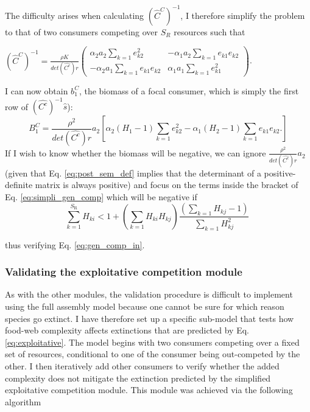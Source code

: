 \documentclass[a4paper]{report}
\begin{document}
The difficulty arises when calculating $(\hat{C}^{C})^{-1}$, I therefore simplify the problem to that of two consumers competing
over $S_{R}$ resources such that
\begin{center}
$(\hat{C}^{C})^{-1}=\frac{\rho K}{det(\hat{C^{c}})r}\begin{pmatrix}\alpha_{2}a_{2}\sum_{k=1}e_{k2}^{2} & -\alpha_{1}a_{2}\sum_{k=1}e_{k1}e_{k2}\\
-\alpha_{2}a_{1}\sum_{k=1}e_{k1}e_{k2} & \alpha_{1}a_{1}\sum_{k=1}e_{k1}^{2}
\end{pmatrix}$.
\end{center}
I can now obtain $b_{1}^{C}$, the biomass of a focal consumer, which
is simply the first row of $(\hat{C^{c}})^{-1}\hat{s}$):
\begin{equation}
B_{1}^{C}=\frac{\rho^{2}}{det(\hat{C^{c}})r}a_{2}[\alpha_{2}(H_{1}-1)\sum_{k=1}e_{k2}^{2}-\alpha_{1}(H_{2}-1)\sum_{k=1}e_{k1}e_{k2}.]\label{eq:simpli_gen_comp}
\end{equation}
If I wish to know whether the biomass will be negative, we
can ignore $\frac{\rho^{2}}{det(\hat{C^{c}})r}a_{2}$ (given that Eq. \eqref{eq:post_sem_def} implies that the determinant
of a positive-definite matrix is always positive) and focus on the
terms inside the bracket of Eq. \eqref{eq:simpli_gen_comp} which will be negative if 
\begin{equation}
 \sum_{k=1}^{S_{\mathrm{R}}}H_{ki}<1+
 \left(
   \sum_{k=1}H_{ki}H_{kj}
\right)\frac{(\sum_{k=1}H_{kj}-1)}{\sum_{k=1}H_{kj}^{2}}\ \label{eq:exploitative}
\end{equation}

thus verifying Eq. \eqref{eq:gen_comp_in}.

\subsubsection{Validating the exploitative competition module}

As with the other modules, the validation procedure is difficult to implement using the full assembly model because one cannot be sure for which reason species go extinct. I have therefore set up a specific sub-model that tests how food-web complexity affects extinctions that are predicted by Eq. \eqref{eq:exploitative}. The model begins with two consumers competing over a fixed set of resources, conditional to one of the consumer being out-competed by the other. I then iteratively add other consumers to verify whether the added complexity does not mitigate the extinction predicted by the simplified exploitative competition module. This module was achieved via the following algorithm
\end{document}
